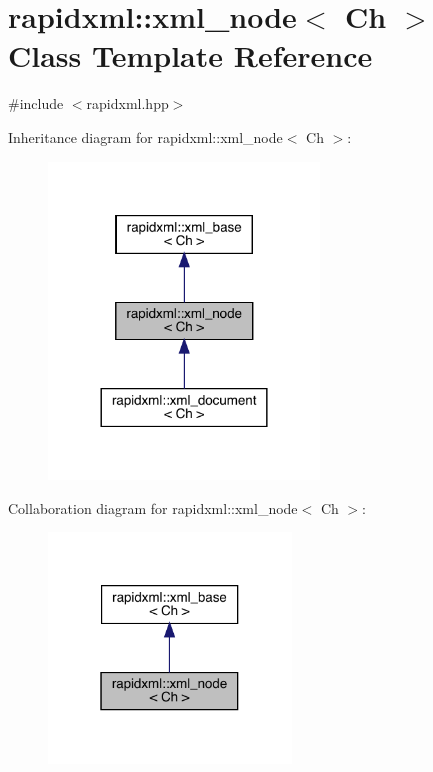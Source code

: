 \hypertarget{classrapidxml_1_1xml__node}{}\section{rapidxml\+::xml\+\_\+node$<$ Ch $>$ Class Template Reference}
\label{classrapidxml_1_1xml__node}


{\ttfamily \#include $<$rapidxml.\+hpp$>$}



Inheritance diagram for rapidxml\+::xml\+\_\+node$<$ Ch $>$\+:\nopagebreak
\begin{figure}[H]
\begin{center}
\leavevmode
\includegraphics[width=204pt]{classrapidxml_1_1xml__node__inherit__graph}
\end{center}
\end{figure}


Collaboration diagram for rapidxml\+::xml\+\_\+node$<$ Ch $>$\+:\nopagebreak
\begin{figure}[H]
\begin{center}
\leavevmode
\includegraphics[width=183pt]{classrapidxml_1_1xml__node__coll__graph}
\end{center}
\end{figure}
